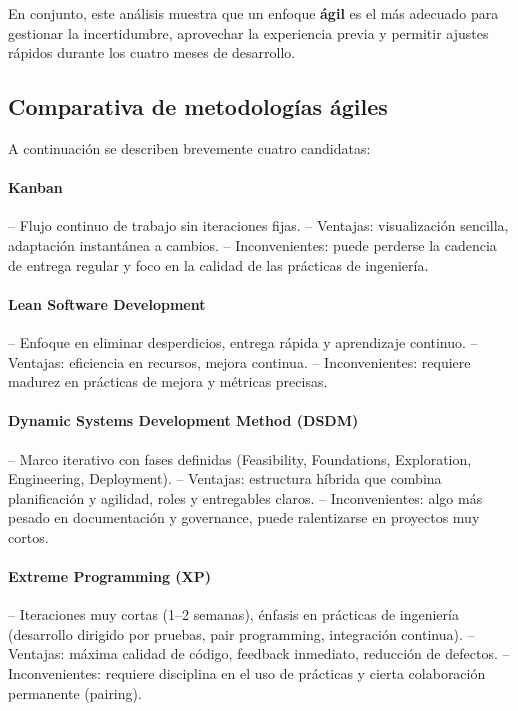 En conjunto, este análisis muestra que un enfoque \textbf{ágil} es el más adecuado para gestionar la incertidumbre, aprovechar la experiencia previa y permitir ajustes rápidos durante los cuatro meses de desarrollo.

\subsection{Comparativa de metodologías ágiles}
A continuación se describen brevemente cuatro candidatas:

\paragraph{Kanban}  
– Flujo continuo de trabajo sin iteraciones fijas.  
– Ventajas: visualización sencilla, adaptación instantánea a cambios.  
– Inconvenientes: puede perderse la cadencia de entrega regular y foco en la calidad de las prácticas de ingeniería.

\paragraph{Lean Software Development}  
– Enfoque en eliminar desperdicios, entrega rápida y aprendizaje continuo.  
– Ventajas: eficiencia en recursos, mejora continua.  
– Inconvenientes: requiere madurez en prácticas de mejora y métricas precisas.

\paragraph{Dynamic Systems Development Method (DSDM)}  
– Marco iterativo con fases definidas (Feasibility, Foundations, Exploration, Engineering, Deployment).  
– Ventajas: estructura híbrida que combina planificación y agilidad, roles y entregables claros.  
– Inconvenientes: algo más pesado en documentación y governance, puede ralentizarse en proyectos muy cortos.

\paragraph{Extreme Programming (XP)}  
– Iteraciones muy cortas (1–2 semanas), énfasis en prácticas de ingeniería (desarrollo dirigido por pruebas, pair programming, integración continua).  
– Ventajas: máxima calidad de código, feedback inmediato, reducción de defectos.  
– Inconvenientes: requiere disciplina en el uso de prácticas y cierta colaboración permanente (pairing).

